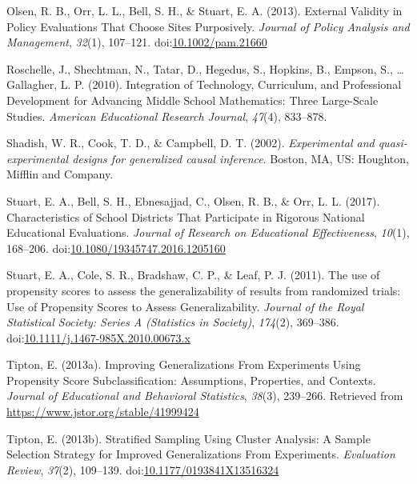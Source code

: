 \documentclass[man,floatsintext]{apa6}
\begin{document}
\leavevmode\hypertarget{ref-olsenExternalValidityPolicy2013}{}%
Olsen, R. B., Orr, L. L., Bell, S. H., \& Stuart, E. A. (2013). External Validity in Policy Evaluations That Choose Sites Purposively. \emph{Journal of Policy Analysis and Management}, \emph{32}(1), 107--121. doi:\href{https://doi.org/10.1002/pam.21660}{10.1002/pam.21660}

\leavevmode\hypertarget{ref-roschelleIntegrationTechnologyCurriculum2010}{}%
Roschelle, J., Shechtman, N., Tatar, D., Hegedus, S., Hopkins, B., Empson, S., \ldots{} Gallagher, L. P. (2010). Integration of Technology, Curriculum, and Professional Development for Advancing Middle School Mathematics: Three Large-Scale Studies. \emph{American Educational Research Journal}, \emph{47}(4), 833--878.

\leavevmode\hypertarget{ref-shadishExperimentalQuasiexperimentalDesigns2002}{}%
Shadish, W. R., Cook, T. D., \& Campbell, D. T. (2002). \emph{Experimental and quasi-experimental designs for generalized causal inference}. Boston, MA, US: Houghton, Mifflin and Company.

\leavevmode\hypertarget{ref-stuartCharacteristicsSchoolDistricts2017}{}%
Stuart, E. A., Bell, S. H., Ebnesajjad, C., Olsen, R. B., \& Orr, L. L. (2017). Characteristics of School Districts That Participate in Rigorous National Educational Evaluations. \emph{Journal of Research on Educational Effectiveness}, \emph{10}(1), 168--206. doi:\href{https://doi.org/10.1080/19345747.2016.1205160}{10.1080/19345747.2016.1205160}

\leavevmode\hypertarget{ref-stuartUsePropensityScores2011}{}%
Stuart, E. A., Cole, S. R., Bradshaw, C. P., \& Leaf, P. J. (2011). The use of propensity scores to assess the generalizability of results from randomized trials: Use of Propensity Scores to Assess Generalizability. \emph{Journal of the Royal Statistical Society: Series A (Statistics in Society)}, \emph{174}(2), 369--386. doi:\href{https://doi.org/10.1111/j.1467-985X.2010.00673.x}{10.1111/j.1467-985X.2010.00673.x}

\leavevmode\hypertarget{ref-tiptonImprovingGeneralizationsExperiments2013}{}%
Tipton, E. (2013a). Improving Generalizations From Experiments Using Propensity Score Subclassification: Assumptions, Properties, and Contexts. \emph{Journal of Educational and Behavioral Statistics}, \emph{38}(3), 239--266. Retrieved from \url{https://www.jstor.org/stable/41999424}

\leavevmode\hypertarget{ref-tiptonStratifiedSamplingUsing2013}{}%
Tipton, E. (2013b). Stratified Sampling Using Cluster Analysis: A Sample Selection Strategy for Improved Generalizations From Experiments. \emph{Evaluation Review}, \emph{37}(2), 109--139. doi:\href{https://doi.org/10.1177/0193841X13516324}{10.1177/0193841X13516324}
\end{document}
